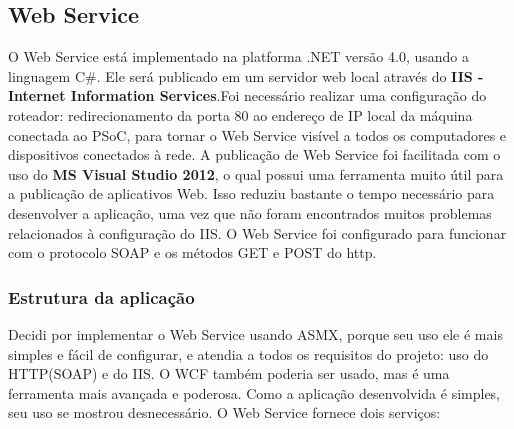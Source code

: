 \documentclass[a4paper,12pt,titlepage]{article}
\begin{document}
			 
	\subsection{Web Service}
		O Web Service está implementado na platforma .NET versão 4.0, usando a linguagem C\#. Ele será publicado em um servidor web local através do \textbf{IIS - Internet Information Services}.Foi necessário realizar uma configuração do roteador: redirecionamento da porta 80 ao endereço de IP local da máquina conectada ao PSoC, para tornar o Web Service visível a todos os computadores e dispositivos conectados à rede. 
		A publicação de Web Service foi facilitada com o uso do \textbf{MS Visual Studio 2012}, o qual possui uma ferramenta muito útil para a publicação de aplicativos Web. Isso reduziu bastante o tempo necessário para desenvolver a aplicação, uma vez que não foram encontrados muitos problemas relacionados à configuração do IIS. O Web Service foi configurado para funcionar com o protocolo SOAP e os métodos  GET e POST do http. 
		
		\subsubsection{Estrutura da aplicação}
			Decidi por implementar o Web Service usando ASMX, porque seu uso ele é mais simples e fácil de configurar, e atendia a todos os requisitos do projeto: uso do HTTP(SOAP) e do IIS. O WCF também poderia ser usado, mas é uma ferramenta mais avançada e poderosa. Como a aplicação desenvolvida é simples, seu uso se mostrou desnecessário.   
			O Web Service fornece dois serviços:
\end{document}
